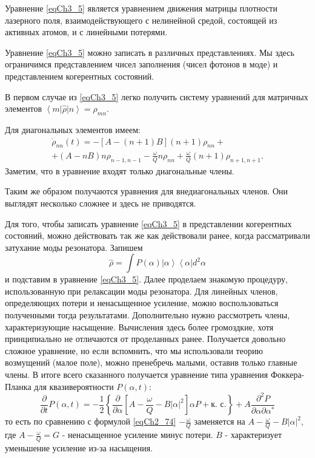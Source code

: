 Уравнение \eqref{eqCh3_5} является уравнением движения матрицы
плотности лазерного поля, взаимодействующего с нелинейной средой,
состоящей из активных атомов, и с линейными потерями. 

Уравнение \eqref{eqCh3_5} можно записать в различных
представлениях. Мы здесь ограничимся представлением чисел заполнения
(чисел фотонов в моде) и представлением когерентных состояний. 

В первом случае из \eqref{eqCh3_5} легко получить систему уравнений
для матричных элементов $\left<m\right|\hat{\rho}\left|n\right> =
\rho_{mn}$.  

Для диагональных элементов имеем:
\begin{eqnarray}
\dot{\rho}_{nn}\left(t\right) = 
-\left[A - \left(n + 1\right)B\right]\left(n + 1\right)\rho_{nn} +
\nonumber \\
+ \left(A - n B\right)n \rho_{n - 1, n - 1} 
- \frac{\omega}{Q}n \rho_{nn} + 
\frac{\omega}{Q} \left(n + 1\right)\rho_{n + 1, n + 1}.
\label{eqCh3_6}
\end{eqnarray}
Заметим, что в уравнение входят только диагональные члены. 

Таким же образом получаются уравнения для внедиагональных членов. Они
выглядят несколько сложнее и здесь не приводятся. 

Для того, чтобы записать уравнение \eqref{eqCh3_5} в представлении
когерентных состояний, можно действовать так же как действовали ранее,
когда рассматривали затухание моды резонатора. Запишем 
\[
\hat{\rho} = \int
P\left(\alpha\right)\left|\alpha\right>\left<\alpha\right| d^2 \alpha 
\]
и подставим в уравнение \eqref{eqCh3_5}. Далее проделаем знакомую
процедуру, использованную при релаксации моды резонатора. Для линейных
членов, определяющих потери и ненасыщенное усиление, можно
воспользоваться полученными тогда результатами. Дополнительно нужно
рассмотреть члены, характеризующие насыщение. Вычисления здесь более
громоздкие, хотя принципиально не отличаются от проделанных
ранее. Получается довольно сложное уравнение, но если вспомнить, что
мы использовали теорию возмущений (малое поле), можно пренебречь
малыми, оставив только главные члены\cite{bMandel2000}. 
В итоге всего сказанного получается
уравнение типа уравнения Фоккера-Планка для квазивероятности
$P\left(\alpha, t\right)$:  
\begin{equation}
\frac{\partial}{\partial t} P\left(\alpha, t\right) = 
- \frac{1}{2}\left\{ 
\frac{\partial}{\partial \alpha}
\left[
A - \frac{\omega}{Q} - B \left|\alpha\right|^2
\right] \alpha P + \mbox{к. с.}
\right\} + 
A \frac{\partial^2 P}{\partial \alpha \partial \alpha^{*}}
\label{eqCh3_7}
\end{equation}
то есть по сравнению с формулой \eqref{eqCh2_74} $-\frac{\omega}{Q}$
заменяется на $A - \frac{\omega}{Q} - B\left|\alpha\right|^2$,  где $A
- \frac{\omega}{Q} = G$ - ненасыщенное усиление минус потери. $B$ - 
характеризует уменьшение усиление из-за насыщения. 
